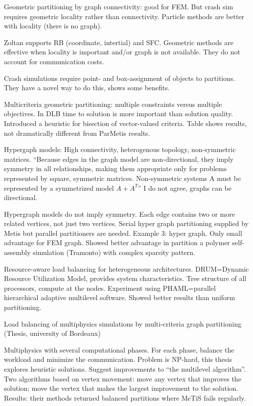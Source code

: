 \documentclass{article}
\begin{document}
Geometric partitioning by graph connectivity: good for FEM.  But crash sim requires geometric locality rather than connectivity.  Particle methods are better with locality (there is no graph).

Zoltan supports 
RB (coordinate, intertial)
and
SFC.
Geometric methods are effective when locality is important and/or graph is not available.
They do not account for communication costs.

Crash simulations require point- and box-assignment of objects to partitions.  They have a novel way to do this, shows some benefits.

Multicriteria geometric partitioning:
multiple constraints versus multiple objectives.
In DLB time to solution is more important than solution quality.
Introduced a heuristic for bisection of vector-valued criteria.
Table shows results, not dramatically different from ParMetis results.

Hypergaph models:
High connectivity, heterogenous topology, non-symmetric matrices.
“Because edges in the graph model are non-directional, they imply symmetry in all relationships, making them appropriate only for problems represented by square, symmetric matrices. Non-symmetric systems A must be represented by a symmetrized model $A + A^T $”
I do not agree, graphs can be directional.

Hypergraph models do not imply symmetry.
Each edge contains two or more related vertices, not just two vertices.
Serial hyper graph partitioning supplied by Metis but parallel partitioners are needed.
Example 3: hyper graph.
Only small advantage for FEM graph.
Showed better advantage in partition a polymer self-assembly simulation (Tramonto) with complex sparsity pattern.

Resource-aware load balancing for heterogeneous architectures.
DRUM=Dynamic Resource Utilization Model, provides system characteristics.
Tree structure of all processors, compute at the nodes.
Experiment using PHAML=parallel hierarchical adaptive multilevel software.
Showed better results than uniform partitioning.


\cite{javataskpool}



\cite{barat:tel-01672546}


Load balancing of multiphysics simulations by multi-criteria graph partitioning
(Thesis, university of Bordeaux)

Multiphysics with several computational phases.
For each phase, balance the workload and minimize the communication.
Problem is NP-hard, this thesis explores heuristic solutions.
Suggest improvements to “the multilevel algorithm”.
Two algorithms based on vertex movement: move any vertex that improves the solution; move the vertex that makes the largest improvement to the solution.
Results: their methods returned balanced partitions where MeTiS fails regularly.
\end{document}

